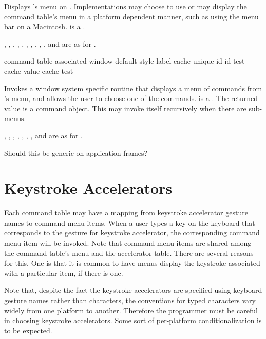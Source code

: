 Displays 's menu on .  Implementations may choose
to use  or may display the command table's menu in a
platform dependent manner, such as using the menu bar on a Macintosh.
 is a .

, , , ,
, , , ,
, , and  are as for
.

 {command-table
                                                 \key associated-window default-style label
                                                      cache unique-id id-test
                                                      cache-value cache-test}

Invokes a window system specific routine that displays a menu of commands from
's menu, and allows the user to choose one of the commands.
 is a .  The returned value is
a command object.  This may invoke itself recursively when there are sub-menus.

, , , ,
, , , and  are as
for .

 {Should this be generic on application frames?}


\section {Keystroke Accelerators}

Each command table may have a mapping from keystroke accelerator gesture names
to command menu items.  When a user types a key on the keyboard that corresponds
to the gesture for keystroke accelerator, the corresponding command menu item
will be invoked.  Note that command menu items are shared among the command
table's menu and the accelerator table.  There are several reasons for this.
One is that it is common to have menus display the keystroke associated with a
particular item, if there is one.

Note that, despite the fact the keystroke accelerators are specified using
keyboard gesture names rather than characters, the conventions for typed
characters vary widely from one platform to another.  Therefore the programmer
must be careful in choosing keystroke accelerators.  Some sort of per-platform
conditionalization is to be expected.


